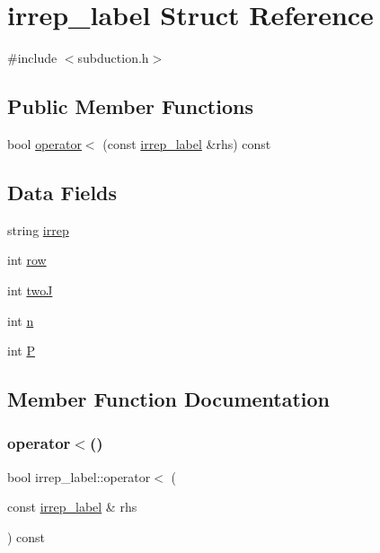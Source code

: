 \hypertarget{structirrep__label}{}\section{irrep\+\_\+label Struct Reference}
\label{structirrep__label}


{\ttfamily \#include $<$subduction.\+h$>$}

\subsection*{Public Member Functions}
\begin{DoxyCompactItemize}
\item 
bool \mbox{\hyperlink{structirrep__label_aed7f86acf9c55f4007a313bbd72485e1}{operator$<$}} (const \mbox{\hyperlink{structirrep__label}{irrep\+\_\+label}} \&rhs) const
\end{DoxyCompactItemize}
\subsection*{Data Fields}
\begin{DoxyCompactItemize}
\item 
string \mbox{\hyperlink{structirrep__label_a21e18e087b0a2a1d22886c0244d7e7e6}{irrep}}
\item 
int \mbox{\hyperlink{structirrep__label_a3e47b0519d5ae65e48b1e3fe509bcc13}{row}}
\item 
int \mbox{\hyperlink{structirrep__label_a2815db2b707875ae496bdbfd52d3c240}{twoJ}}
\item 
int \mbox{\hyperlink{structirrep__label_a6f7203722a797aa0fb81e1e4a7370ad8}{n}}
\item 
int \mbox{\hyperlink{structirrep__label_a87f13a9fa6fc452cd31cfbc8cbc5197d}{P}}
\end{DoxyCompactItemize}


\subsection{Member Function Documentation}
\mbox{\label{structirrep__label_aed7f86acf9c55f4007a313bbd72485e1}} 
\subsubsection{\texorpdfstring{operator$<$()}{operator<()}}
{\footnotesize\ttfamily bool irrep\+\_\+label\+::operator$<$ (\begin{DoxyParamCaption}\item[{const \mbox{\hyperlink{structirrep__label}{irrep\+\_\+label}} \&}]{rhs }\end{DoxyParamCaption}) const}



